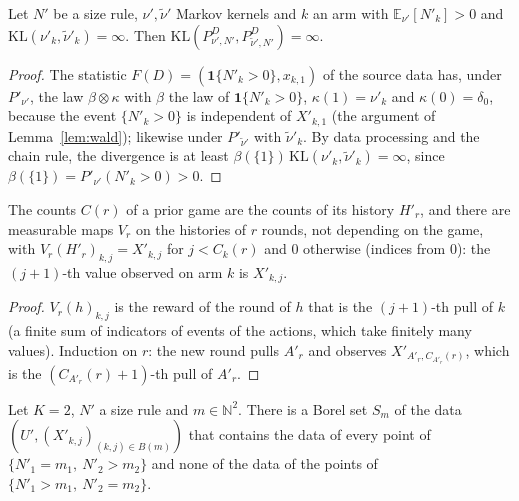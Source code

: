 \documentclass[11pt]{article}
\newcommand{\E}{\mathbb{E}}
\begin{document}
\begin{lemma}\label{flem:source-kl-top}
Let $N'$ be a size rule, $\nu',\tilde\nu'$ Markov kernels and $k$ an arm with
$\E_{\nu'}[N'_k]>0$ and $\mathrm{KL}(\nu'_k,\tilde\nu'_k)=\infty$. Then
$\mathrm{KL}(P^D_{\nu',N'},P^D_{\tilde\nu',N'})=\infty$.
\end{lemma}

\begin{proof}
The statistic $F(D)=(\mathbf 1\{N'_k>0\},x_{k,1})$ of the source data has, under $P'_{\nu'}$, the
law $\beta\otimes\kappa$ with $\beta$ the law of $\mathbf 1\{N'_k>0\}$, $\kappa(1)=\nu'_k$ and
$\kappa(0)=\delta_0$, because the event $\{N'_k>0\}$ is independent of $X'_{k,1}$ (the argument of
Lemma~\ref{lem:wald}); likewise under $P'_{\tilde\nu'}$ with $\tilde\nu'_k$. By data processing and
the chain rule, the divergence is at least
$\beta(\{1\})\,\mathrm{KL}(\nu'_k,\tilde\nu'_k)=\infty$, since $\beta(\{1\})=P'_{\nu'}(N'_k>0)>0$.
\end{proof}

\begin{lemma}\label{flem:stack-of-history}
The counts $C(r)$ of a prior game are the counts of its history $H'_r$, and there are measurable
maps $V_r$ on the histories of $r$ rounds, not depending on the game, with
$V_r(H'_r)_{k,j}=X'_{k,j}$ for $j<C_k(r)$ and $0$ otherwise (indices from $0$): the $(j+1)$-th
value observed on arm $k$ is $X'_{k,j}$.
\end{lemma}

\begin{proof}
$V_r(h)_{k,j}$ is the reward of the round of $h$ that is the $(j+1)$-th pull of $k$ (a finite sum
of indicators of events of the actions, which take finitely many values). Induction on $r$: the
new round pulls $A'_r$ and observes $X'_{A'_r,C_{A'_r}(r)}$, which is the $(C_{A'_r}(r)+1)$-th pull
of $A'_r$.
\end{proof}

\begin{lemma}\label{flem:separating}
Let $K=2$, $N'$ a size rule and $m\in\mathbb N^2$. There is a Borel set $S_m$ of the data
$(U',(X'_{k,j})_{(k,j)\in B(m)})$ that contains the data of every point of
$\{N'_1=m_1,\ N'_2>m_2\}$ and none of the data of the points of $\{N'_1>m_1,\ N'_2=m_2\}$.
\end{lemma}
\end{document}
